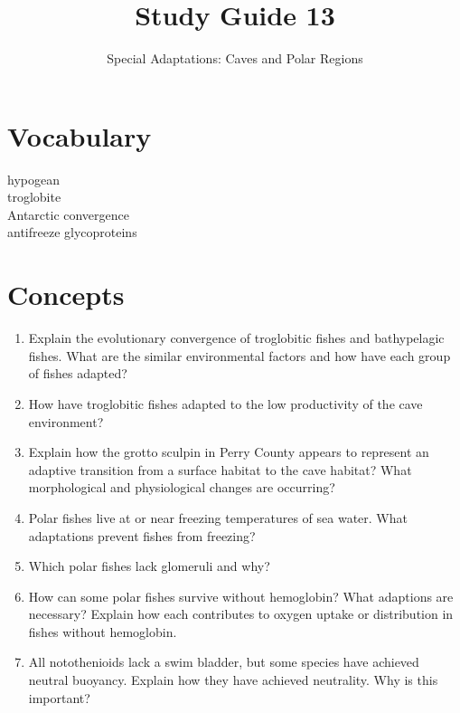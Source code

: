 \documentclass[letterpaper]{tufte-handout}
\title{Study Guide 13}
\author{Special Adaptations: Caves and Polar Regions}
\date{} %
\begin{document}
\maketitle	%


\section{Vocabulary} 
\vspace{-1\baselineskip}
\begin{multicols}{2}
hypogean \\
troglobite \\
Antarctic convergence \\
antifreeze glycoproteins
\end{multicols}

\section{Concepts}

\begin{enumerate}
	\item Explain the evolutionary convergence of troglobitic fishes and bathypelagic fishes.  What are the similar environmental factors and how have each group of fishes adapted?

	\item How have troglobitic fishes adapted to the low productivity of the cave environment?

	\item Explain how the grotto sculpin in Perry County appears to represent an adaptive transition from a surface habitat to the cave habitat?  What morphological and physiological changes are occurring?

	\item Polar fishes live at or near freezing temperatures of sea water.  What adaptations prevent fishes from freezing?

	\item Which polar fishes lack glomeruli and why?

	\item How can some polar fishes survive without hemoglobin?  What adaptions are necessary?  Explain how each contributes to oxygen uptake or distribution in fishes without hemoglobin.

	\item All notothenioids lack a swim bladder, but some species have achieved neutral buoyancy.  Explain how they have achieved neutrality.  Why is this important?
	
\end{enumerate}
\end{document}
